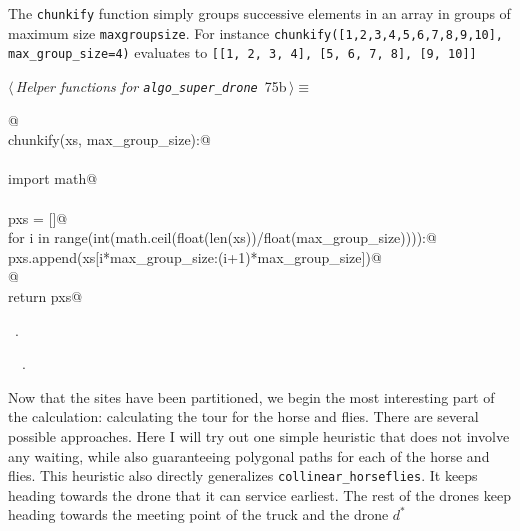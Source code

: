 \documentclass[11.5pt]{report}
\begin{document}
\vspace{-0.8cm} \newchunk The \verb|chunkify| function simply groups successive elements in an array 
in groups of maximum size \verb|maxgroupsize|. For instance \verb|chunkify([1,2,3,4,5,6,7,8,9,10], max_group_size=4)|
evaluates to \verb|[[1, 2, 3, 4], [5, 6, 7, 8], [9, 10]]|
\begin{flushleft} \small
\begin{minipage}{\linewidth}\label{scrap113}\raggedright\small
{} $\langle\,${\itshape Helper functions for \verb|algo_super_drone|}\nobreak\ {\footnotesize {75b}}$\,\rangle\equiv$
\vspace{-1ex}
\begin{list}{}{} \item
\mbox{}\verb@ @\\
\mbox{}\verb@def chunkify(xs, max_group_size):@\\
\mbox{}\verb@@\\
\mbox{}\verb@    import math@\\
\mbox{}\verb@@\\
\mbox{}\verb@    pxs = []@\\
\mbox{}\verb@    for i in range(int(math.ceil(float(len(xs))/float(max_group_size)))):@\\
\mbox{}\verb@       pxs.append(xs[i*max_group_size:(i+1)*max_group_size])@\\
\mbox{}\verb@    @\\
\mbox{}\verb@    return pxs@\\
\mbox{}\verb@@{\NWsep}
\end{list}
\vspace{-1.5ex}
\footnotesize
\begin{list}{}{\setlength{\itemsep}{-\parsep}\setlength{\itemindent}{-\leftmargin}}
\item \NWtxtMacroRefIn\ .
\item \NWtxtIdentsDefed\nobreak\  \verb@chunkify@\nobreak\ .
\item{}
\end{list}
\end{minipage}\vspace{4ex}
\end{flushleft}


\vspace{-0.8cm} \newchunk Now that the sites have been partitioned, we begin the most interesting
part of the calculation: calculating the tour for the horse and flies. There are several possible 
approaches. Here I will try out one simple heuristic that does not involve any waiting, while also 
guaranteeing polygonal paths for each of the horse and flies. This heuristic also directly generalizes
\verb|collinear_horseflies|. It keeps heading towards the drone that it can service earliest. 
The rest of the drones keep heading towards the meeting point of the truck and the drone $d^{*}$
\end{document}
